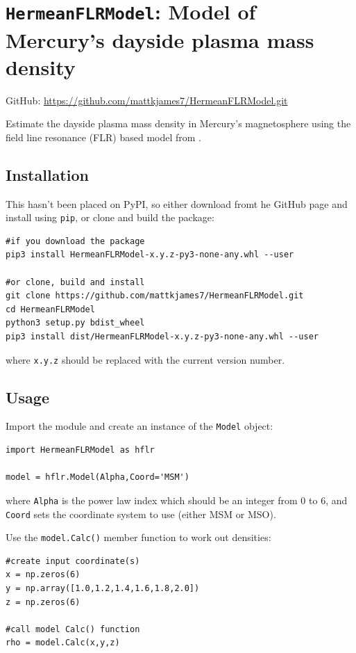 	\section{\texttt{HermeanFLRModel}: Model of Mercury's dayside plasma mass density}

		GitHub: \href{https://github.com/mattkjames7/HermeanFLRModel.git}{https://github.com/mattkjames7/HermeanFLRModel.git}

		Estimate the dayside plasma mass density in Mercury's magnetosphere using the field line resonance (FLR) based model from \citet{James2019}.

		\subsection{Installation}

			This hasn't been placed on PyPI, so either download fromt he GitHub page and install using \texttt{pip}, or clone and build the package:
			\begin{verbatim}
#if you download the package
pip3 install HermeanFLRModel-x.y.z-py3-none-any.whl --user

#or clone, build and install
git clone https://github.com/mattkjames7/HermeanFLRModel.git
cd HermeanFLRModel
python3 setup.py bdist_wheel
pip3 install dist/HermeanFLRModel-x.y.z-py3-none-any.whl --user
			\end{verbatim}
			where \texttt{x.y.z} should be replaced with the current version number.

		\subsection{Usage}

			Import the module and create an instance of the \texttt{Model} object:
			\begin{verbatim}
import HermeanFLRModel as hflr

model = hflr.Model(Alpha,Coord='MSM')
			\end{verbatim}
			where \texttt{Alpha} is the power law index which should be an integer from 0 to 6, and \texttt{Coord} sets the coordinate system to use (either MSM or MSO).

			Use the \texttt{model.Calc()} member function to work out densities:
			\begin{verbatim}
#create input coordinate(s)
x = np.zeros(6)
y = np.array([1.0,1.2,1.4,1.6,1.8,2.0])
z = np.zeros(6)

#call model Calc() function
rho = model.Calc(x,y,z)
			\end{verbatim}

